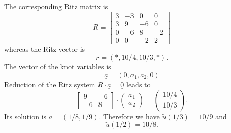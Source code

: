 \begin{loesung}
\begin{teilaufgaben}
\item
The corresponding Ritz matrix is
\begin{equation}
R
=
\left[
\begin{array}{rrrr}
3 & -3 & 0 & 0 \\
3 & 9 & - 6 & 0 \\
0 & -6 & 8 & -2 \\
0 & 0 & -2 & 2
\end{array}
\right]
\tag{1P}
\end{equation}
whereas the Ritz vector is
\[
\underline{r} = (*,10/4,10/3,*).
\]
The vector of the knot variables is
\[
\underline{a} = (0, a_1, a_2, 0)
\]
Reduction of the Ritz system
$R \cdot  \underline{a} = \underline{0}$
leads to  
\[
\left[
\begin{array}{rr}
9 & -6 \\
 -6 & 8
\end{array}
\right]
\cdot
\left(
\begin{array}{r}
a_1 \\
a_2
\end{array}
\right)
=
\left(
\begin{array}{r}
10/4 \\
10/3
\end{array}
\right).
\]
Its solution is
$\underline{a} = (1/8, 1/9)$.
Therefore we have $\tilde u(1/3) = 10/9$ and
\begin{equation}
\tilde u(1/2) = 10/8. \tag{1P}
\end{equation}


\end{teilaufgaben}
\end{loesung}
